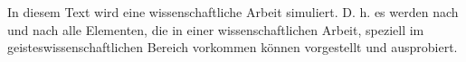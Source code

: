 \label{cha:vorwort}
In diesem Text wird eine wissenschaftliche Arbeit simuliert. D. h. es werden nach und nach alle Elementen, die in einer wissenschaftlichen Arbeit, speziell im geisteswissenschaftlichen Bereich vorkommen können vorgestellt und ausprobiert. 

